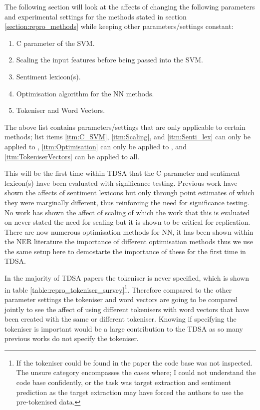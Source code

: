 The following section will look at the affects of changing the following parameters and experimental settings for the methods stated in section \ref{section:repro_methods} while keeping other parameters/settings constant:
\begin{enumerate}
    \item \label{itm:C_SVM} C parameter of the SVM.
    \item \label{itm:Scaling} Scaling the input features before being passed into the SVM.
    \item \label{itm:Senti_lex} Sentiment lexicon(s).
    \item \label{itm:Optimisation} Optimisation algorithm for the NN methods.
    \item \label{itm:TokeniserVectors} Tokeniser and Word Vectors.
\end{enumerate}
The above list contains parameters/settings that are only applicable to certain methods; list items \ref{itm:C_SVM}, \ref{itm:Scaling}, and \ref{itm:Senti_lex} can only be applied to \citet{vo2015target, wang-etal-2017-tdparse}, \ref{itm:Optimisation} can only be applied to \citet{tang-etal-2014-learning}, and \ref{itm:TokeniserVectors} can be applied to all.

This will be the first time within TDSA that the C parameter and sentiment lexicon(s) have been evaluated with significance testing. Previous work \citep{vo2015target} have shown the affects of sentiment lexicons but only through point estimates of which they were marginally different, thus reinforcing the need for significance testing. No work has shown the affect of scaling of which the work that this is evaluated on \citep{vo2015target,wang-etal-2017-tdparse} never stated the need for scaling but it is shown to be critical for replication. There are now numerous optimisation methods for NN, it has been shown within the NER literature \citep{reimers-gurevych-2017-reporting,yang-etal-2018-design} the importance of different optimisation methods thus we use the same setup here to demostarte the importance of these for the first time in TDSA.

In the majority of TDSA papers the tokeniser is never specified, which is shown in table \ref{table:repro_tokeniser_survey}\footnote{If the tokeniser could be found in the paper the code base was not inspected. The unsure category encompasses the cases where; I could not understand the code base confidently, or the task was target extraction and sentiment prediction as the target extraction may have forced the authors to use the pre-tokenised data.}. Therefore compared to the other parameter settings the tokeniser and word vectors are going to be compared jointly to see the affect of using different tokenisers with word vectors that have been created with the same or different tokeniser. Knowing if specifying the tokeniser is important would be a large contribution to the TDSA as so many previous works do not specify the tokeniser.

